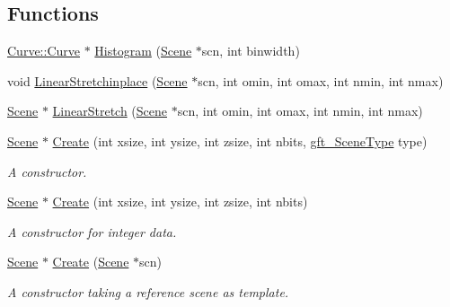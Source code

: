 \subsection*{Functions}
\begin{DoxyCompactItemize}
\item 
\hyperlink{namespacegft_1_1Curve_acc891f63f04c17f7b2cafe7ed9ecffdb}{Curve\-::\-Curve} $\ast$ \hyperlink{namespacegft_1_1Scene_aaa91422448b12349092606366936d3e5}{Histogram} (\hyperlink{namespacegft_1_1Scene_a9c4af0354661c7f13881605f34dd4f52}{Scene} $\ast$scn, int binwidth)
\item 
void \hyperlink{namespacegft_1_1Scene_a3b0cf5094d6ba89e0e22cdf3981f7bd4}{Linear\-Stretchinplace} (\hyperlink{namespacegft_1_1Scene_a9c4af0354661c7f13881605f34dd4f52}{Scene} $\ast$scn, int omin, int omax, int nmin, int nmax)
\item 
\hyperlink{namespacegft_1_1Scene_a9c4af0354661c7f13881605f34dd4f52}{Scene} $\ast$ \hyperlink{namespacegft_1_1Scene_ab49b349d8edf1e47eca0208ad083d9d7}{Linear\-Stretch} (\hyperlink{namespacegft_1_1Scene_a9c4af0354661c7f13881605f34dd4f52}{Scene} $\ast$scn, int omin, int omax, int nmin, int nmax)
\item 
\hyperlink{namespacegft_1_1Scene_a9c4af0354661c7f13881605f34dd4f52}{Scene} $\ast$ \hyperlink{namespacegft_1_1Scene_abc48c34d557169d9efbc4db679fc692b}{Create} (int xsize, int ysize, int zsize, int nbits, \hyperlink{gft__scene_8h_aff9f098ca5c194977bd33369499b22ed}{gft\-\_\-\-Scene\-Type} type)
\begin{DoxyCompactList}\small\item\em A constructor. \end{DoxyCompactList}\item 
\hyperlink{namespacegft_1_1Scene_a9c4af0354661c7f13881605f34dd4f52}{Scene} $\ast$ \hyperlink{namespacegft_1_1Scene_a9c3b2ad09a5b0d17d768e20d88785d09}{Create} (int xsize, int ysize, int zsize, int nbits)
\begin{DoxyCompactList}\small\item\em A constructor for integer data. \end{DoxyCompactList}\item 
\hyperlink{namespacegft_1_1Scene_a9c4af0354661c7f13881605f34dd4f52}{Scene} $\ast$ \hyperlink{namespacegft_1_1Scene_af34f1fc9809fb7bc0a127ef5fcc58113}{Create} (\hyperlink{namespacegft_1_1Scene_a9c4af0354661c7f13881605f34dd4f52}{Scene} $\ast$scn)
\begin{DoxyCompactList}\small\item\em A constructor taking a reference scene as template. \end{DoxyCompactList}\item 

\end{DoxyCompactItemize}
